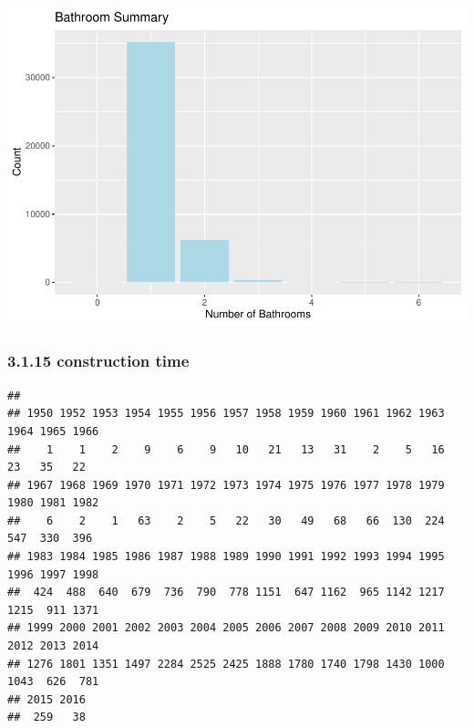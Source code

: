 \documentclass[
]{article}
\newenvironment{Shaded}{\begin{snugshade}}{\end{snugshade}}
\newcommand{\FunctionTok}[1]{\textcolor[rgb]{0.00,0.00,0.00}{#1}}
\newcommand{\NormalTok}[1]{#1}
\newcommand{\SpecialCharTok}[1]{\textcolor[rgb]{0.00,0.00,0.00}{#1}}
\begin{document}
\includegraphics{Project_files/figure-latex/unnamed-chunk-26-1.pdf}

\hypertarget{construction-time}{%
\subsubsection{3.1.15 construction time}\label{construction-time}}

\begin{Shaded}
\end{Shaded}

\begin{verbatim}
## 
## 1950 1952 1953 1954 1955 1956 1957 1958 1959 1960 1961 1962 1963 1964 1965 1966 
##    1    1    2    9    6    9   10   21   13   31    2    5   16   23   35   22 
## 1967 1968 1969 1970 1971 1972 1973 1974 1975 1976 1977 1978 1979 1980 1981 1982 
##    6    2    1   63    2    5   22   30   49   68   66  130  224  547  330  396 
## 1983 1984 1985 1986 1987 1988 1989 1990 1991 1992 1993 1994 1995 1996 1997 1998 
##  424  488  640  679  736  790  778 1151  647 1162  965 1142 1217 1215  911 1371 
## 1999 2000 2001 2002 2003 2004 2005 2006 2007 2008 2009 2010 2011 2012 2013 2014 
## 1276 1801 1351 1497 2284 2525 2425 1888 1780 1740 1798 1430 1000 1043  626  781 
## 2015 2016 
##  259   38
\end{verbatim}

\begin{Shaded}
\end{Shaded}
\end{document}
